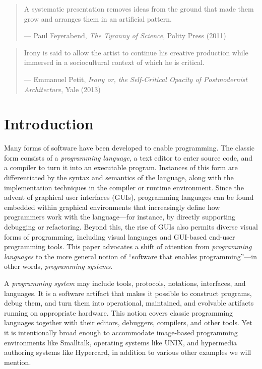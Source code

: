 \begin{quote}
A systematic presentation removes ideas from the ground that made them
grow and arranges them in an artificial pattern.

--- Paul Feyerabend, \emph{The Tyranny of Science}, Polity Press (2011)
\end{quote}

\begin{quote}
Irony is said to allow the artist to continue his creative production
while immersed in a sociocultural context of which he is critical.

--- Emmanuel Petit, \emph{Irony or, the Self-Critical Opacity of
Postmodernist Architecture}, Yale (2013)
\end{quote}

\hypertarget{introduction}{%
\section{Introduction}\label{introduction}}

Many forms of software have been developed to enable programming. The
classic form consists of a \emph{programming language}, a text editor to
enter source code, and a compiler to turn it into an executable program.
Instances of this form are differentiated by the syntax and semantics of
the language, along with the implementation techniques in the compiler
or runtime environment. Since the advent of graphical user interfaces
(GUIs), programming languages can be found embedded within graphical
environments that increasingly define how programmers work with the
language---for instance, by directly supporting debugging or
refactoring. Beyond this, the rise of GUIs also permits diverse visual
forms of programming, including visual languages and GUI-based end-user
programming tools. This paper advocates a shift of attention from
\emph{programming languages} to the more general notion of ``software
that enables programming''---in other words, \emph{programming systems}.

A \emph{programming system} may include tools, protocols, notations,
interfaces, and languages. It is a software artifact that makes it
possible to construct programs, debug them, and turn them into
operational, maintained, and evolvable artifacts running on appropriate
hardware. This notion covers classic programming languages together with
their editors, debuggers, compilers, and other tools. Yet it is
intentionally broad enough to accommodate image-based programming
environments like Smalltalk, operating systems like UNIX, and hypermedia
authoring systems like Hypercard, in addition to various other examples
we will mention.

